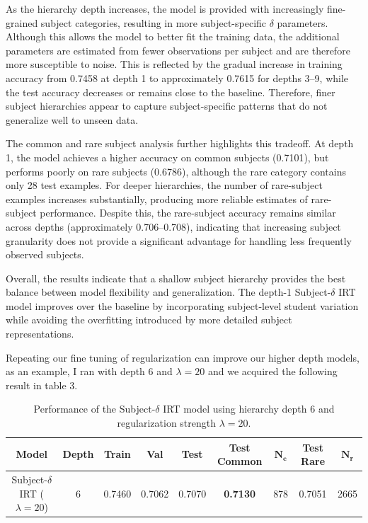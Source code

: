 \documentclass[11pt]{article}
\begin{document}
As the hierarchy depth increases, the model is provided with increasingly fine-grained subject categories, resulting in more subject-specific $\delta$ parameters. Although this allows the model to better fit the training data, the additional parameters are estimated from fewer observations per subject and are therefore more susceptible to noise. This is reflected by the gradual increase in training accuracy from 0.7458 at depth 1 to approximately 0.7615 for depths 3--9, while the test accuracy decreases or remains close to the baseline. Therefore, finer subject hierarchies appear to capture subject-specific patterns that do not generalize well to unseen data.

The common and rare subject analysis further highlights this tradeoff. At depth 1, the model achieves a higher accuracy on common subjects (0.7101), but performs poorly on rare subjects (0.6786), although the rare category contains only 28 test examples. For deeper hierarchies, the number of rare-subject examples increases substantially, producing more reliable estimates of rare-subject performance. Despite this, the rare-subject accuracy remains similar across depths (approximately 0.706--0.708), indicating that increasing subject granularity does not provide a significant advantage for handling less frequently observed subjects.

Overall, the results indicate that a shallow subject hierarchy provides the best balance between model flexibility and generalization. The depth-1 Subject-$\delta$ IRT model improves over the baseline by incorporating subject-level student variation while avoiding the overfitting introduced by more detailed subject representations.

Repeating our fine tuning of regularization can improve our higher depth models, as an example, I ran with depth 6 and $\lambda = 20$ and we acquired the following result in table 3.

\begin{table}[h]
\centering
\small
\setlength{\tabcolsep}{6pt}
\begin{tabular}{c|c|ccc|cc|cc}
\hline
\textbf{Model} & \textbf{Depth} 
& \textbf{Train} & \textbf{Val} & \textbf{Test}
& \textbf{Test Common} & $\mathbf{N_c}$
& \textbf{Test Rare} & $\mathbf{N_r}$ \\
\hline
Subject-$\delta$ IRT ($\lambda=20$) & 6
& 0.7460 & 0.7062 & 0.7070
& \textbf{0.7130} & 878
& 0.7051 & 2665 \\
\hline
\end{tabular}
\caption{Performance of the Subject-$\delta$ IRT model using hierarchy depth 6 and regularization strength $\lambda=20$.}
\label{tab:lambda20_depth6}
\end{table}
\end{document}

